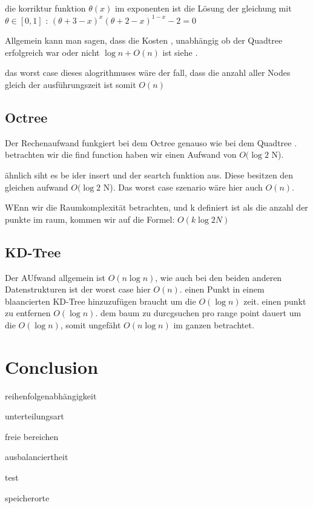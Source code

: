 \documentclass[11pt]{article}
\newcommand{\qt}{Quadtree }
\newcommand{\oc}{Octree }
\newcommand{\kd}{KD-Tree }
\begin{document}
die korriktur funktion $\theta(x)$ im exponenten ist die Lösung der gleichung mit $\theta \in [0,1]$ : 
$(\theta + 3 -x)^x(\theta + 2 - x)^{1-x} -2 = 0$

Allgemein kann man sagen, dass die Kosten , unabhängig ob der \qt erfolgreich war oder nicht $\log n + O(n)$ ist siehe \cite[S.475ff]{quadtree} .


das worst case dieses alogrithmuses wäre der fall, dass die anzahl aller Nodes gleich der ausführungszeit ist somit $O(n)$

\subsection{\oc}

Der Rechenaufwand funkgiert bei dem \oc genauso wie bei dem \qt . 
betrachten wir die find function haben wir einen Aufwand von $O(\log2 $ N). 

ähnlich siht es be ider insert und der seartch funktion aus. Diese besitzen den gleichen aufwand  $O(\log2 $ N).
Das worst case szenario wäre hier auch $O(n)$. 

WEnn wir die Raumkomplexität betrachten, und k definiert ist als die anzahl der punkte im raum, kommen wir auf die Formel: $O(k \log2 N) $ 


\subsection{\kd}

Der AUfwand allgemein ist $O(n \log n)$, wie auch bei den beiden anderen Datenstrukturen ist der worst case hier $O(n)$. 
einen Punkt in einem blaancierten \kd hinzuzufügen braucht um die $O(\log n)$ zeit. einen punkt zu entfernen $O(\log n)$. 
dem baum zu durcgsuchen pro range point dauert um die $O(\log n)$, somit ungefäht $O(n \log n)$ im ganzen betrachtet. 

\pagebreak

\section{Conclusion}
reihenfolgenabhängigkeit 

unterteilungsart

freie bereichen

ausbalanciertheit 

test

speicherorte 

\pagebreak


\end{document}
